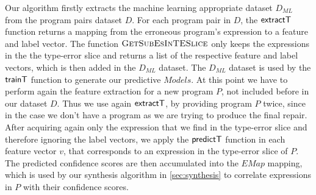 Our algorithm firstly extracts the machine learning appropriate dataset $D_{ML}$
from the program pairs dataset $D$. For each program pair in $D$, the
$\mathsf{extractT}$ function returns a mapping from the erroneous program's
expression to a feature and label vector. The function
$\textsc{GetSubEsInTESlice}$ only keeps the expressions in the the type-error
slice and returns a list of the respective feature and label vectors, which is
then added in the $D_{ML}$ dataset. The $D_{ML}$ dataset is used by the
$\mathsf{trainT}$ function to generate our predictive $Models$. At this point we have
to perform again the feature extraction for a new program $P$, not included
before in our dataset $D$. Thus we use again $\mathsf{extractT}$, by providing
program $P$ twice, since in the case we don't have a program as we are trying to
produce the final repair. After acquiring again only the expression that we find
in the type-error slice and therefore ignoring the label vectors, we apply the
$\mathsf{predictT}$ function in each feature vector $v$, that corresponds to an
expression in the type-error slice of $P$. The predicted confidence scores are
then accumulated into the $EMap$ mapping, which is used by our synthesis
algorithm in \autoref{sec:synthesis} to correlate expressions in $P$ with their
confidence scores.


